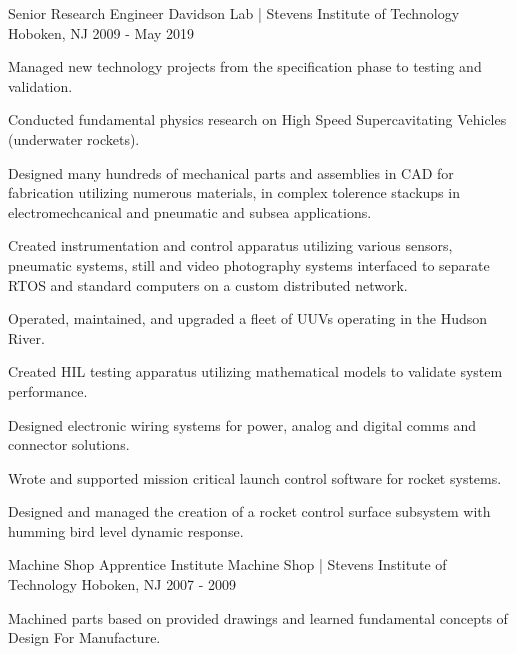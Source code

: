 \begin{cventries}
  \cventry
    {Senior Research Engineer} %
    {Davidson Lab | Stevens Institute of Technology} %
    {Hoboken, NJ} %
    {2009 - May 2019} %
    {
      \begin{cvitems} %
        \item {Managed new technology projects from the specification phase to testing and validation.} 
        \item {Conducted fundamental physics research on High Speed Supercavitating Vehicles (underwater rockets).}
        \item {Designed many hundreds of mechanical parts and assemblies in CAD for fabrication utilizing numerous materials, in complex tolerence stackups in electromechcanical and pneumatic and subsea applications.}
        \item {Created instrumentation and control apparatus utilizing various sensors, pneumatic systems, still and video photography systems
            interfaced to separate RTOS and standard computers on a custom distributed network.} 
        \item {Operated, maintained, and upgraded a fleet of UUVs operating in the Hudson River.}
        \item {Created HIL testing apparatus utilizing mathematical models to validate system performance.} 
        \item {Designed electronic wiring systems for power, analog and digital comms and connector solutions.}
        \item {Wrote and supported mission critical launch control software for rocket systems.} 
        \item {Designed and managed the creation of a rocket control surface subsystem with humming bird level dynamic response.}
      \end{cvitems}
    }


  \cventry
    {Machine Shop Apprentice} %
    {Institute Machine Shop | Stevens Institute of Technology} %
    {Hoboken, NJ} %
    {2007 - 2009} %
    {%
      \begin{cvitems} %
        \item {Machined parts based on provided drawings and learned fundamental concepts of Design For Manufacture.}
      \end{cvitems}
    }

\end{cventries}
